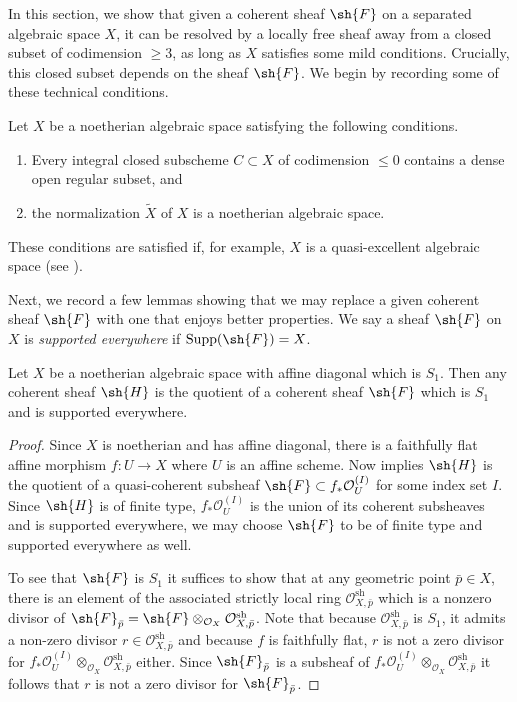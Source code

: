 \documentclass[12pt]{amsart}
\begin{document}
In this section, we show that given a coherent sheaf $\sh{F}$ on a separated algebraic space $X$, it can be resolved by a locally free sheaf away from a closed subset of codimension $\geq 3$, as long as $X$ satisfies some mild conditions. Crucially, this closed subset depends on the sheaf $\sh{F}$. We begin by recording some of these technical conditions.
\begin{assumption} \label{conditions} Let $X$ be a noetherian algebraic space satisfying the following conditions. 
\begin{enumerate} 
\item Every integral closed subscheme $C \subset X$ of codimension $\leq 0$ contains a dense open regular subset, and 
\item the normalization $\tilde{X}$ of $X$ is a noetherian algebraic space. \end{enumerate}
\end{assumption} 

\noindent These conditions are satisfied if, for example, $X$ is a quasi-excellent algebraic space (see \cite[Remark 7.2]{hall2014coherent}).

Next, we record a few lemmas showing that we may replace a given coherent sheaf $\sh{F}$ with one that enjoys better properties. We say a sheaf $\sh{F}$ on $X$ is \emph{supported everywhere} if $\text{Supp}(\sh{F})=X$. 

\begin{lemma} \label{S_1} Let $X$ be a noetherian algebraic space with affine diagonal which is $S_1$. Then any coherent sheaf $\sh{H}$ is the quotient of a coherent sheaf $\sh{F}$ which is $S_1$ and is supported everywhere. \end{lemma}

\begin{proof} Since $X$ is noetherian and has affine diagonal, there is a faithfully flat affine morphism $f: U \to X$ where $U$ is an affine scheme. Now \cite[Lem. 2.14]{GrossRes} implies $\sh{H}$ is the quotient of a quasi-coherent subsheaf $\sh{F} \subset f_*\mathcal{O}_{U}^{(I)}$ for some index set $I$. Since $\sh{H}$ is of finite type, $f_*\mathcal{O}_{U}^{(I)}$ is the union of its coherent subsheaves and is supported everywhere, we may choose $\sh{F}$ to be of finite type and supported everywhere as well.

To see that $\sh{F}$ is $S_1$ it suffices to show that at any geometric point $\bar{p} \in X$, there is an element of the associated strictly local ring $\mathcal{O}_{X,\bar{p}}^{\text{sh}}$ which is a nonzero divisor of $\sh{F}_{\bar{p}}=\sh{F} \otimes_{\mathcal{O}_X} \mathcal{O}_{X,\bar{p}}^{\text{sh}}$. Note that because $\mathcal{O}_{X,\bar{p}}^{\text{sh}}$ is $S_1$, it admits a non-zero divisor $r \in \mathcal{O}_{X,\bar{p}}^{\text{sh}}$ and because $f$ is faithfully flat, $r$ is not a zero divisor for $f_*\mathcal{O}_{U}^{(I)} \otimes_{\mathcal{O}_X} \mathcal{O}_{X,\bar{p}}^{\text{sh}}$ either. Since $\sh{F}_{\bar{p}}$ is a subsheaf of $f_*\mathcal{O}_{U}^{(I)} \otimes_{\mathcal{O}_X} \mathcal{O}_{X,\bar{p}}^{\text{sh}}$ it follows that $r$ is not a zero divisor for $\sh{F}_{\bar{p}}$. \end{proof}
\end{document}
